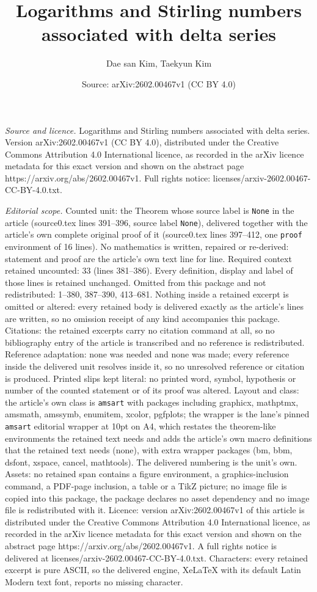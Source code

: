 \documentclass[10pt,a4paper]{amsart}
\title[Logarithms and Stirling numbers associated with delta series]{Logarithms and Stirling numbers associated with delta series}
\author{Dae san Kim, Taekyun Kim}
\date{Source: arXiv:2602.00467v1 (CC BY 4.0)}
\begin{document}
\maketitle

\noindent\emph{Source and licence.} Logarithms and Stirling numbers associated with delta series. Version arXiv:2602.00467v1 (CC BY 4.0), distributed under the Creative Commons Attribution 4.0 International licence, as recorded in the arXiv licence metadata for this exact version and shown on the abstract page https://arxiv.org/abs/2602.00467v1. Full rights notice: licenses/arxiv-2602.00467-CC-BY-4.0.txt.\par\smallskip

\noindent\textit{Editorial scope.} Counted unit: the Theorem whose source label is \texttt{None} in the article (source0.tex lines 391--396, source label \texttt{None}), delivered together with the article's own complete original proof of it (source0.tex lines 397--412, one \texttt{proof} environment of 16 lines). No mathematics is written, repaired or re-derived: statement and proof are the article's own text line for line. Required context retained uncounted: 33 (lines 381--386). Every definition, display and label of those lines is retained unchanged. Omitted from this package and not redistributed: 1--380, 387--390, 413--681. Nothing inside a retained excerpt is omitted or altered: every retained body is delivered exactly as the article's lines are written, so no omission receipt of any kind accompanies this package. Citations: the retained excerpts carry no citation command at all, so no bibliography entry of the article is transcribed and no reference is redistributed. Reference adaptation: none was needed and none was made; every reference inside the delivered unit resolves inside it, so no unresolved reference or citation is produced. Printed slips kept literal: no printed word, symbol, hypothesis or number of the counted statement or of its proof was altered. Layout and class: the article's own class is \texttt{amsart} with packages including graphicx, mathptmx, amsmath, amssymb, enumitem, xcolor, pgfplots; the wrapper is the lane's pinned \texttt{amsart} editorial wrapper at 10pt on A4, which restates the theorem-like environments the retained text needs and adds the article's own macro definitions that the retained text needs (none), with extra wrapper packages (bm, bbm, dsfont, xspace, cancel, mathtools). The delivered numbering is the unit's own. Assets: no retained span contains a figure environment, a graphics-inclusion command, a PDF-page inclusion, a table or a TikZ picture; no image file is copied into this package, the package declares no asset dependency and no image file is redistributed with it. Licence: version arXiv:2602.00467v1 of this article is distributed under the Creative Commons Attribution 4.0 International licence, as recorded in the arXiv licence metadata for this exact version and shown on the abstract page https://arxiv.org/abs/2602.00467v1. A full rights notice is delivered at licenses/arxiv-2602.00467-CC-BY-4.0.txt. Characters: every retained excerpt is pure ASCII, so the delivered engine, XeLaTeX with its default Latin Modern text font, reports no missing character.
\end{document}
